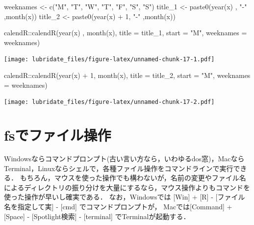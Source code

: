 \documentclass[
]{article}
\newenvironment{Shaded}{\begin{snugshade}}{\end{snugshade}}
\newcommand{\AttributeTok}[1]{\textcolor[rgb]{0.77,0.63,0.00}{#1}}
\newcommand{\DecValTok}[1]{\textcolor[rgb]{0.00,0.00,0.81}{#1}}
\newcommand{\FunctionTok}[1]{\textcolor[rgb]{0.00,0.00,0.00}{#1}}
\newcommand{\NormalTok}[1]{#1}
\newcommand{\OtherTok}[1]{\textcolor[rgb]{0.56,0.35,0.01}{#1}}
\newcommand{\SpecialCharTok}[1]{\textcolor[rgb]{0.00,0.00,0.00}{#1}}
\newcommand{\StringTok}[1]{\textcolor[rgb]{0.31,0.60,0.02}{#1}}
\begin{document}
\begin{Shaded}
\begin{Highlighting}[]
\NormalTok{weeknames }\OtherTok{\textless{}{-}}  \FunctionTok{c}\NormalTok{(}\StringTok{"M"}\NormalTok{, }\StringTok{"T"}\NormalTok{, }\StringTok{"W"}\NormalTok{, }\StringTok{"T"}\NormalTok{, }\StringTok{"F"}\NormalTok{, }\StringTok{"S"}\NormalTok{, }\StringTok{"S"}\NormalTok{)}
\NormalTok{title\_1 }\OtherTok{\textless{}{-}} \FunctionTok{paste0}\NormalTok{(}\FunctionTok{year}\NormalTok{(x)    , }\StringTok{"{-}"}\NormalTok{ ,}\FunctionTok{month}\NormalTok{(x))}
\NormalTok{title\_2 }\OtherTok{\textless{}{-}} \FunctionTok{paste0}\NormalTok{(}\FunctionTok{year}\NormalTok{(x) }\SpecialCharTok{+} \DecValTok{1}\NormalTok{, }\StringTok{"{-}"}\NormalTok{ ,}\FunctionTok{month}\NormalTok{(x))}

\NormalTok{calendR}\SpecialCharTok{::}\FunctionTok{calendR}\NormalTok{(}\FunctionTok{year}\NormalTok{(x)    , }\FunctionTok{month}\NormalTok{(x), }\AttributeTok{title =}\NormalTok{ title\_1, }\AttributeTok{start =} \StringTok{"M"}\NormalTok{, }\AttributeTok{weeknames =}\NormalTok{ weeknames)}
\end{Highlighting}
\end{Shaded}

\texttt{[image: lubridate\_files/figure-latex/unnamed-chunk-17-1.pdf]}

\begin{Shaded}
\begin{Highlighting}[]
\NormalTok{calendR}\SpecialCharTok{::}\FunctionTok{calendR}\NormalTok{(}\FunctionTok{year}\NormalTok{(x) }\SpecialCharTok{+} \DecValTok{1}\NormalTok{, }\FunctionTok{month}\NormalTok{(x), }\AttributeTok{title =}\NormalTok{ title\_2, }\AttributeTok{start =} \StringTok{"M"}\NormalTok{, }\AttributeTok{weeknames =}\NormalTok{ weeknames)}
\end{Highlighting}
\end{Shaded}

\texttt{[image: lubridate\_files/figure-latex/unnamed-chunk-17-2.pdf]}

\hypertarget{fs}{%
\section{fsでファイル操作}\label{fs}}

Windowsならコマンドプロンプト(古い言い方なら，いわゆるdos窓)，MacならTerminal，Linuxならシェルで，各種ファイル操作をコマンドラインで実行できる．
もちろん，マウスを使った操作でも構わないが，名前の変更やファイル名によるディレクトリの振り分けを大量にするなら，マウス操作よりもコマンドを使った操作が早いし確実である．
なお，Windowsでは {[}Win{]} + {[}R{]} - {[}ファイル名を指定して実{]} - {[}cmd{]} でコマンドプロンプトが，
Macでは{[}Command{]} + {[}Space{]} - {[}Spotlight検索{]} - {[}terminal{]} でTerminalが起動する．
\end{document}
